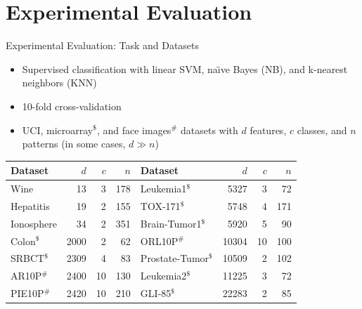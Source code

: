 \documentclass{beamer}
\begin{document}
\section[Experimental Evaluation]{Experimental Evaluation}
\begin{frame}{Experimental Evaluation: Task and Datasets}
\begin{itemize}
	\item Supervised classification with linear SVM, na\"{\i}ve Bayes (NB), and k-nearest neighbors (KNN)
	\item 10-fold cross-validation
	\item UCI, microarray$^\$$, and face images$^\#$ datasets with $d$ features, $c$ classes, and $n$ patterns (in some cases, $d \gg n$)
\end{itemize}
\vfill
\begin{table}
	\centering \scriptsize
	\begin{tabular}{|l|r|r|r||l|r|r|r|}
		\hline
		\textbf{Dataset} & $d$   &  $c$   & $n$    &  \textbf{Dataset} & $d$   &  $c$   & $n$  \\ \hline \hline
 	  Wine             & 13    &   3    &  178   &  Leukemia1$^\$$       & 5327    &   3    & 72 \\ \hline
 		Hepatitis        & 19    &   2    &  155   &  TOX-171$^\$$	 				 & 5748	   &   4	  &  171	\\ \hline
 		Ionosphere       & 34    &   2    &  351   &  Brain-Tumor1$^\$$    & 5920    &   5    &   90   \\ \hline
 		Colon$^\$$           & 2000    &   2    & 62   &  ORL10P$^\#$           & 10304   &  10   &  100    \\ \hline
 		SRBCT$^\$$           & 2309    &   4    & 83   & Prostate-Tumor$^\$$   & 10509   &   2    &  102 \\ \hline
 		AR10P$^\#$          & 2400    &  10    &   130  &   	   Leukemia2$^\$$       & 11225   &   3    &   72   \\ \hline
    PIE10P$^\#$         & 2420    &  10    &   210  &       GLI-85$^\$$	         & 22283	 &   2	  &   85   \\ \hline 		
\end{tabular}
\label{TAB1}
\end{table}
\end{frame}


\end{document}
